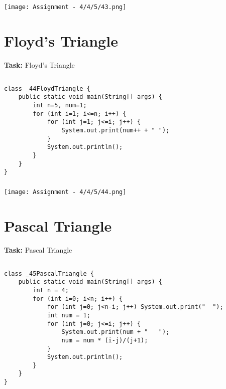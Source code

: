 \documentclass[12pt,a4paper]{article}
\begin{document}
\subsubsection{}
\begin{center}
    \texttt{[image: Assignment - 4/4/5/43.png]}
\end{center}


\section{Floyd's Triangle}
\textbf{Task:} Floyd's Triangle

\subsection{}
\begin{lstlisting}
class _44FloydTriangle {
    public static void main(String[] args) {
        int n=5, num=1;
        for (int i=1; i<=n; i++) {
            for (int j=1; j<=i; j++) {
                System.out.print(num++ + " ");
            }
            System.out.println();
        }
    }
}
\end{lstlisting}

\subsubsection{}
\begin{center}
    \texttt{[image: Assignment - 4/4/5/44.png]}
\end{center}


\section{Pascal Triangle}
\textbf{Task:} Pascal Triangle

\subsection{}
\begin{lstlisting}
class _45PascalTriangle {
    public static void main(String[] args) {
        int n = 4;
        for (int i=0; i<n; i++) {
            for (int j=0; j<n-i; j++) System.out.print("  ");
            int num = 1;
            for (int j=0; j<=i; j++) {
                System.out.print(num + "   ");
                num = num * (i-j)/(j+1);
            }
            System.out.println();
        }
    }
}
\end{lstlisting}
\end{document}
